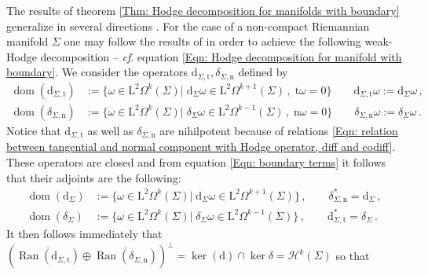 \begin{remark}\label{Rmk: weak-Hodge decomposition}
	The results of theorem \ref{Thm: Hodge decomposition for manifolds with boundary} generalize in several directions \cite{Amar-17,Axelsson-McIntosh-04,Gaffney-55,Gromov-91,Kodaira-49,Li-09,Schwarz-95,Scott-95,Zulfikar-Stroock-00}.
	For the case of a non-compact Riemannian manifold $\Sigma$ one may follow the results of \cite{Axelsson-McIntosh-04} in order to achieve the following weak-Hodge decomposition -- \textit{cf}. equation \eqref{Eqn: Hodge decomposition for manifold with boundary}.
	We consider the operators $\mathrm{d}_{\Sigma,\mathrm{t}},\delta_{\Sigma,\mathrm{n}}$ defined by
	\begin{align}
		\label{Eqn: Dirichlet differential}
		\operatorname{dom}(\mathrm{d}_{\Sigma,\mathrm{t}})&:=\lbrace
		\omega\in\mathrm{L}^2\Omega^k(\Sigma)|\;\mathrm{d}_\Sigma\omega\in\mathrm{L}^2\Omega^{k+1}(\Sigma)\,,\;\mathrm{t}\omega=0\rbrace\qquad
		\mathrm{d}_{\Sigma,\mathrm{t}}\omega:=\mathrm{d}_\Sigma\omega\,,\\
		\label{Eqn: Neumann codifferential}
		\operatorname{dom}(\delta_{\Sigma,\mathrm{n}})&:=\lbrace
		\omega\in\mathrm{L}^2\Omega^k(\Sigma)|\;\delta_\Sigma\omega\in\mathrm{L}^2\Omega^{k-1}(\Sigma)\,,\;\mathrm{n}\omega=0\rbrace\qquad
		\delta_{\Sigma,\mathrm{n}}\omega:=\delta_\Sigma\omega\,.
	\end{align}
	Notice that $\mathrm{d}_{\Sigma,\mathrm{t}}$ as well as $\delta_{\Sigma,\mathrm{n}}$ are nihilpotent because of relations \eqref{Eqn: relation between tangential and normal component with Hodge operator, diff and codiff}.
	These operators are closed and from equation \eqref{Eqn: boundary terms} it follows that their adjoints are the following:
	\begin{align*}
		\operatorname{dom}(\mathrm{d}_\Sigma)&:=\lbrace
		\omega\in\mathrm{L}^2\Omega^k(\Sigma)|\;\mathrm{d}_\Sigma\omega\in\mathrm{L}^2\Omega^{k+1}(\Sigma)\rbrace\,,\qquad
		\delta_{\Sigma,\mathrm{n}}^*=\mathrm{d}_\Sigma\,,\\
		\operatorname{dom}(\delta_\Sigma)&:=\lbrace
		\omega\in\mathrm{L}^2\Omega^k(\Sigma)|\;\delta_\Sigma\omega\in\mathrm{L}^2\Omega^{k-1}(\Sigma)\rbrace\,,\qquad
		\mathrm{d}_{\Sigma,\mathrm{t}}^*=\delta_\Sigma\,.
	\end{align*}
	It then follows immediately that $(\overline{\operatorname{Ran}(\mathrm{d}_{\Sigma,\mathrm{t}})}\oplus\overline{\operatorname{Ran}(\delta_{\Sigma,\mathrm{n}})})^\perp=\ker(\mathrm{d})\cap\ker\delta=\mathcal{H}^k(\Sigma)$ so that
	\begin{align}\label{Eqn: weak-Hodge decomposition for boundary}

\end{align}
\end{remark}
